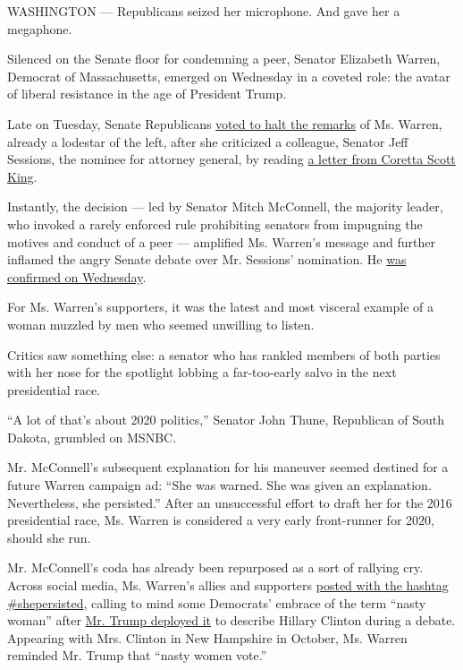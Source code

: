 WASHINGTON --- Republicans seized her microphone. And gave her a
megaphone.

Silenced on the Senate floor for condemning a peer, Senator Elizabeth
Warren, Democrat of Massachusetts, emerged on Wednesday in a coveted
role: the avatar of liberal resistance in the age of President Trump.

Late on Tuesday, Senate Republicans
\href{https://www.nytimes.com/2017/02/07/us/politics/republican-senators-vote-to-formally-silence-elizabeth-warren.html}{voted
to halt the remarks} of Ms. Warren, already a lodestar of the left,
after she criticized a colleague, Senator Jeff Sessions, the nominee for
attorney general, by reading
\href{https://www.nytimes.com/2017/02/08/us/politics/elizabeth-warren-coretta-scott-king-jeff-sessions.html}{a
letter from Coretta Scott King}.

Instantly, the decision --- led by Senator Mitch McConnell, the majority
leader, who invoked a rarely enforced rule prohibiting senators from
impugning the motives and conduct of a peer --- amplified Ms. Warren's
message and further inflamed the angry Senate debate over Mr. Sessions'
nomination. He
\href{https://www.nytimes.com/2017/02/08/us/politics/jeff-sessions-attorney-general-confirmation.html}{was
confirmed on Wednesday}.

For Ms. Warren's supporters, it was the latest and most visceral example
of a woman muzzled by men who seemed unwilling to listen.

Critics saw something else: a senator who has rankled members of both
parties with her nose for the spotlight lobbing a far-too-early salvo in
the next presidential race.

``A lot of that's about 2020 politics,'' Senator John Thune, Republican
of South Dakota, grumbled on MSNBC.

Mr. McConnell's subsequent explanation for his maneuver seemed destined
for a future Warren campaign ad: ``She was warned. She was given an
explanation. Nevertheless, she persisted.'' After an unsuccessful effort
to draft her for the 2016 presidential race, Ms. Warren is considered a
very early front-runner for 2020, should she run.

Mr. McConnell's coda has already been repurposed as a sort of rallying
cry. Across social media, Ms. Warren's allies and supporters
\href{https://www.nytimes.com/2017/02/08/us/politics/elizabeth-warren-republicans-facebook-twitter.html}{posted
with the hashtag \#shepersisted}, calling to mind some Democrats'
embrace of the term ``nasty woman'' after
\href{https://www.nytimes.com/interactive/projects/cp/opinion/clinton-trump-third-debate-election-2016/donald-trumps-nasty-habits}{Mr.
Trump deployed it} to describe Hillary Clinton during a debate.
Appearing with Mrs. Clinton in New Hampshire in October, Ms. Warren
reminded Mr. Trump that ``nasty women vote.''

